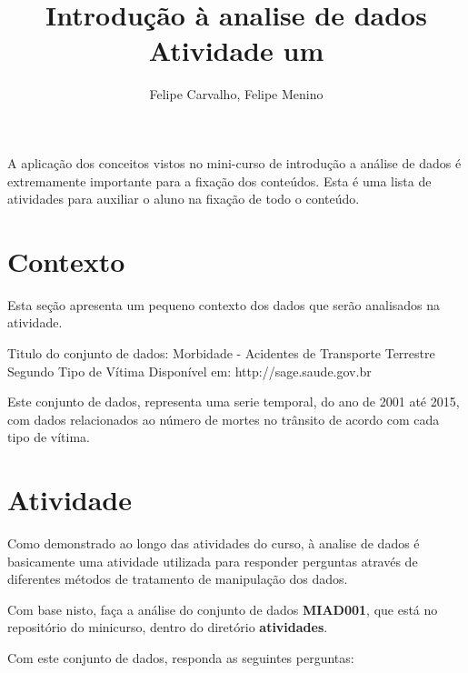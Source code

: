 \documentclass[12pt]{article}
\title{Introdução à analise de dados\\ Atividade um}
\author{Felipe Carvalho\inst{1}, Felipe Menino\inst{2}}
\begin{document}
 

\maketitle

     
\begin{resumo} 
    A aplicação dos conceitos vistos no mini-curso de introdução a análise de dados é extremamente importante para a fixação dos conteúdos. Esta é uma lista de atividades para auxiliar o aluno na fixação de todo o conteúdo.
\end{resumo}

\section{Contexto}

Esta seção apresenta um pequeno contexto dos dados que serão analisados na atividade.

Titulo do conjunto de dados: Morbidade - Acidentes de Transporte Terrestre Segundo Tipo de Vítima
Disponível em: http://sage.saude.gov.br

Este conjunto de dados, representa uma serie temporal, do ano de 2001 até 2015, com dados relacionados ao número de mortes no trânsito de acordo com cada tipo de vítima.

\section{Atividade}

Como demonstrado ao longo das atividades do curso, à analise de dados é basicamente uma atividade utilizada para responder perguntas através de diferentes métodos de tratamento de manipulação dos dados.

Com base nisto, faça a análise do conjunto de dados \textbf{MIAD001}, que está no repositório do minicurso, dentro do diretório \textbf{atividades}.

Com este conjunto de dados, responda as seguintes perguntas:
\end{document}

